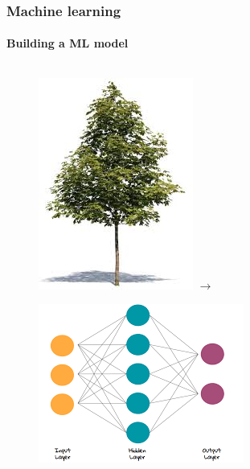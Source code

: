 \documentclass[aspectratio=43]{beamer}
\begin{document}
\begin{frame}
	
	\frametitle{Machine learning}
	\framesubtitle{Building a ML model}
	
	\begin{figure}
		
		\begin{columns}
			\includegraphics[width = \linewidth]{tree3.jpeg}
			$\longrightarrow$
		\end{columns}
		\endminipage
		\hspace*{-1.25cm}	
		\includegraphics[width = 1.25\linewidth]{NN.png}

\end{figure}
\end{frame}
\end{document}
